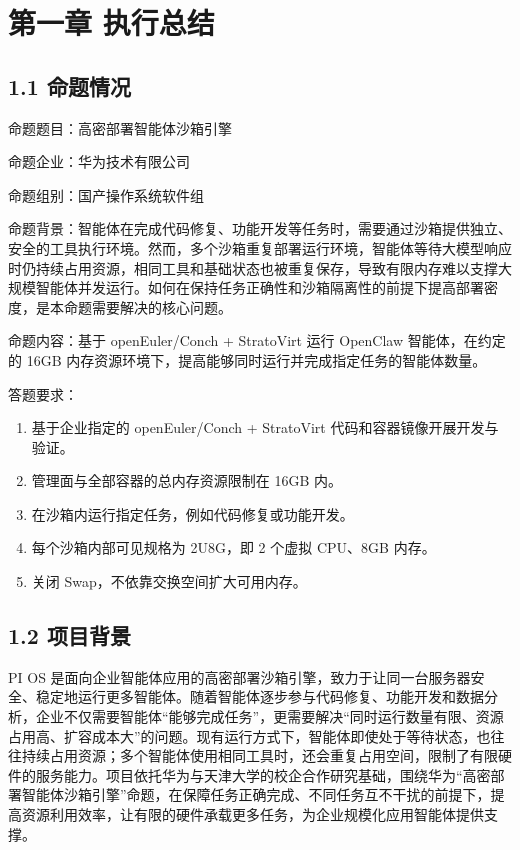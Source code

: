 \section{第一章 执行总结}\label{ux7b2cux4e00ux7ae0-ux6267ux884cux603bux7ed3}

\subsection{1.1 命题情况}\label{ux547dux9898ux60c5ux51b5}

命题题目：高密部署智能体沙箱引擎

命题企业：华为技术有限公司

命题组别：国产操作系统软件组

命题背景：智能体在完成代码修复、功能开发等任务时，需要通过沙箱提供独立、安全的工具执行环境。然而，多个沙箱重复部署运行环境，智能体等待大模型响应时仍持续占用资源，相同工具和基础状态也被重复保存，导致有限内存难以支撑大规模智能体并发运行。如何在保持任务正确性和沙箱隔离性的前提下提高部署密度，是本命题需要解决的核心问题。

命题内容：基于 openEuler/Conch + StratoVirt 运行 OpenClaw 智能体，在约定的 16GB 内存资源环境下，提高能够同时运行并完成指定任务的智能体数量。

答题要求：

\begin{enumerate}

\item
  基于企业指定的 openEuler/Conch + StratoVirt 代码和容器镜像开展开发与验证。
\item
  管理面与全部容器的总内存资源限制在 16GB 内。
\item
  在沙箱内运行指定任务，例如代码修复或功能开发。
\item
  每个沙箱内部可见规格为 2U8G，即 2 个虚拟 CPU、8GB 内存。
\item
  关闭 Swap，不依靠交换空间扩大可用内存。
\end{enumerate}

\subsection{1.2 项目背景}\label{ux9879ux76eeux80ccux666f}

PI OS 是面向企业智能体应用的高密部署沙箱引擎，致力于让同一台服务器安全、稳定地运行更多智能体。随着智能体逐步参与代码修复、功能开发和数据分析，企业不仅需要智能体``能够完成任务''，更需要解决``同时运行数量有限、资源占用高、扩容成本大''的问题。现有运行方式下，智能体即使处于等待状态，也往往持续占用资源；多个智能体使用相同工具时，还会重复占用空间，限制了有限硬件的服务能力。项目依托华为与天津大学的校企合作研究基础，围绕华为``高密部署智能体沙箱引擎''命题，在保障任务正确完成、不同任务互不干扰的前提下，提高资源利用效率，让有限的硬件承载更多任务，为企业规模化应用智能体提供支撑。

